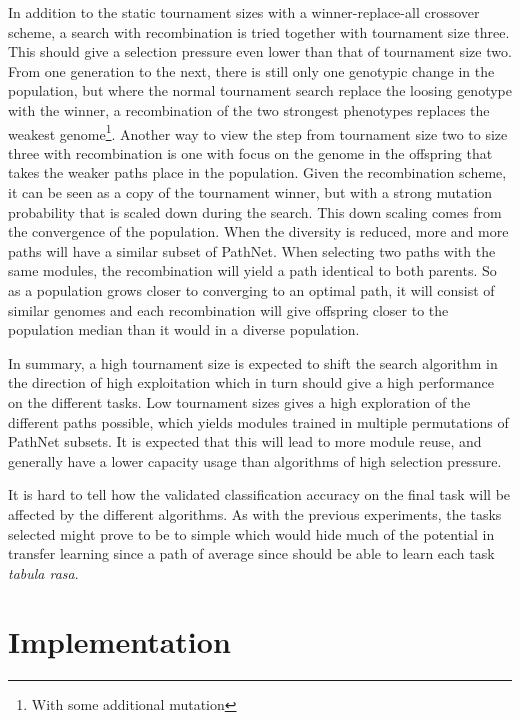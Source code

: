 In addition to the static tournament sizes with a winner-replace-all crossover scheme, a search with recombination is tried together with tournament size three.  This should give a selection pressure even lower than that of tournament size two. From one generation to the next, there is still only one genotypic change in the population, but where the normal tournament search replace the loosing genotype with the winner, a recombination of the two strongest phenotypes replaces the weakest genome\footnote{With some additional mutation}.  Another way to view the step from tournament size two to size three with recombination is one with focus on the genome in the offspring that takes the weaker paths place in the population. Given the recombination scheme, it can be seen as a copy of the tournament winner, but with a strong mutation probability that is scaled down during the search. This down scaling comes from the convergence of the population. When the diversity is reduced, more and more paths will have a similar subset of PathNet. When selecting two paths with the same modules, the recombination will yield a path identical to both parents. So as a population grows closer to converging to an optimal path, it will consist of similar genomes and each recombination will give offspring closer to the population median than it would in a diverse population. 


In summary, a high tournament size is expected to shift the search algorithm in the direction of high exploitation which in turn should give a high performance on the different tasks. Low tournament sizes gives a high exploration of the different paths possible, which yields modules trained in multiple permutations of PathNet subsets. It is expected that this will lead to more module reuse, and generally have a lower capacity usage than algorithms of high selection pressure. 

It is hard to tell how the validated classification accuracy on the final task will be affected by the different algorithms. As with the previous experiments, the tasks selected might prove to be to simple which would hide much of the potential in transfer learning since a path of average since should be able to learn each task \textit{tabula rasa}.


 
\section{Implementation}\label{Search-implementation}
